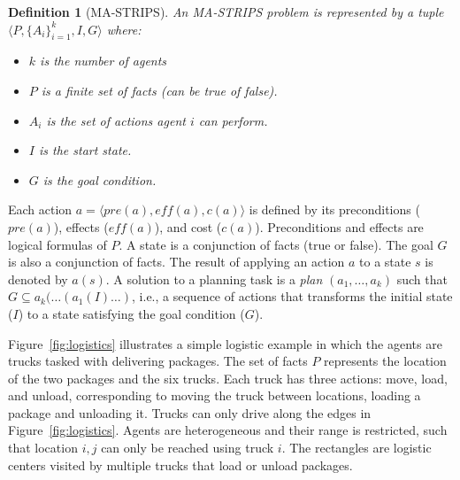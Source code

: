 \documentclass[letterpaper]{article}
\newcommand{\eff}{\textit{eff}}
\newcommand{\pre}{\textit{pre}}
\newtheorem{definition}{Definition}
\theoremstyle{definition}
\begin{document}
\begin{definition}[MA-STRIPS]
An MA-STRIPS problem is represented by a tuple $\langle P, \{A_i\}_{i=1}^k, I ,G \rangle$ where:
\begin{itemize}
	\item $k$ is the number of agents
	\item $P$ is a finite set of facts (can be true of false).
    \item $A_i$ is the set of actions agent $i$ can perform.
	\item $I$ is the start state.
	\item $G$ is the goal condition.
\end{itemize}
\label{def:ma-strips}
\end{definition}
Each action $a=\langle \pre(a), \eff(a), c(a) \rangle$ is defined by its preconditions ($\pre(a)$), effects ($\eff(a)$), and cost ($c(a)$). Preconditions and effects are logical formulas of $P$. A state is a conjunction of facts (true or false). The goal $G$ is also a conjunction of facts. The result of applying an action $a$ to a state $s$ is denoted by $a(s)$. A solution to a planning task is a {\em plan} $(a_1,\ldots,a_k)$ such that $G\subseteq a_k(\ldots(a_1(I)\ldots)$, i.e., a sequence of actions that transforms the initial state ($I$) to a state satisfying the goal condition ($G$).



Figure~\ref{fig:logistics} illustrates a simple logistic example in which the agents are trucks tasked with delivering packages. %
The set of facts $P$ represents the location of the two packages and the six trucks. Each truck has three actions: move, load, and unload, corresponding to moving the truck between locations, loading a package and unloading it. Trucks can only drive along the edges in Figure~\ref{fig:logistics}. Agents are heterogeneous  and their range is restricted, such that location $i,j$ can only be reached using truck $i$. The rectangles are logistic centers visited by multiple trucks that load or unload packages.
\end{document}
